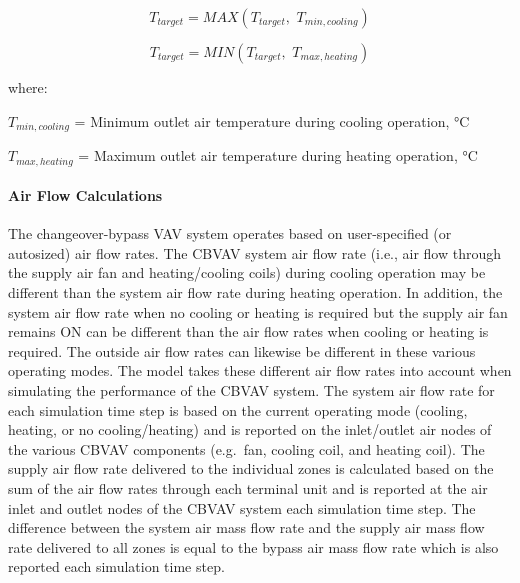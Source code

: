 \begin{equation}
{T_{target}} = MAX\left( {{T_{target}},\,\,{T_{min,cooling}}} \right)
\end{equation}

\begin{equation}
{T_{target}} = MIN\left( {{T_{target}},\,\,{T_{max,heating}}} \right)
\end{equation}

where:

\({T_{min,cooling}}\) = Minimum outlet air temperature during cooling operation, °C

\({T_{max,heating}}\) = Maximum outlet air temperature during heating operation, °C

\paragraph{Air Flow Calculations}\label{air-flow-calculations}

The changeover-bypass VAV system operates based on user-specified (or autosized) air flow rates. The CBVAV system air flow rate (i.e., air flow through the supply air fan and heating/cooling coils) during cooling operation may be different than the system air flow rate during heating operation. In addition, the system air flow rate when no cooling or heating is required but the supply air fan remains ON can be different than the air flow rates when cooling or heating is required. The outside air flow rates can likewise be different in these various operating modes. The model takes these different air flow rates into account when simulating the performance of the CBVAV system. The system air flow rate for each simulation time step is based on the current operating mode (cooling, heating, or no cooling/heating) and is reported on the inlet/outlet air nodes of the various CBVAV components (e.g.~fan, cooling coil, and heating coil). The supply air flow rate delivered to the individual zones is calculated based on the sum of the air flow rates through each terminal unit and is reported at the air inlet and outlet nodes of the CBVAV system each simulation time step. The difference between the system air mass flow rate and the supply air mass flow rate delivered to all zones is equal to the bypass air mass flow rate which is also reported each simulation time step.

